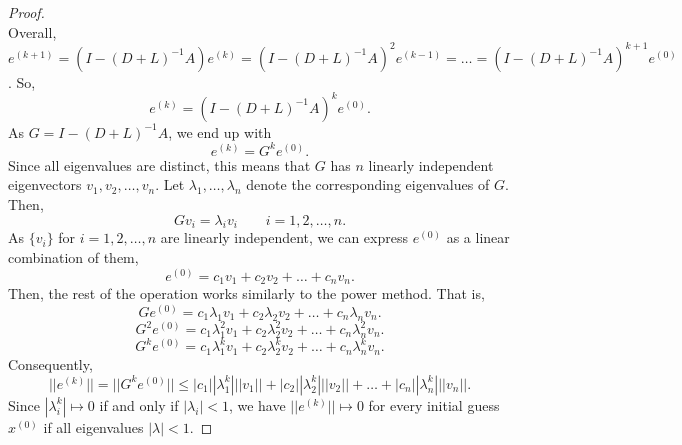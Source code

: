 \documentclass[letterpaper]{article}
\newcommand{\0}{\mathbf{0}}
\begin{document}
\begin{proof}
\begin{equation*}
    \end{equation*}
    Overall, $e^{(k + 1)} = (I - (D + L)^{-1}A)e^{(k)} = (I - (D + L)^{-1}A)^2 e^{(k - 1)} = \hdots = (I - (D + L)^{-1}A)^{k + 1} e^{(0)}$. So, \[e^{(k)} = (I - (D + L)^{-1} A)^k e^{(0)}.\] As $G = I - (D + L)^{-1} A$, we end up with \[e^{(k)} = G^k e^{(0)}.\] Since all eigenvalues are distinct, this means that $G$ has $n$ linearly independent eigenvectors $v_1, v_2, \hdots, v_n$. Let $\lambda_1, \hdots, \lambda_n$ denote the corresponding eigenvalues of $G$. Then, 
    \[Gv_i = \lambda_i v_i \qquad i = 1, 2, \hdots, n.\]
    As $\{v_i\}$ for $i = 1, 2, \hdots, n$ are linearly independent, we can express $e^{(0)}$ as a linear combination of them, 
    \[e^{(0)} = c_1 v_1 + c_2 v_2 + \hdots + c_n v_n.\]
    Then, the rest of the operation works similarly to the power method. That is, 
    \[Ge^{(0)} = c_1 \lambda_1 v_1 + c_2 \lambda_2 v_2 + \hdots + c_n \lambda_n v_n.\]
    \[G^2 e^{(0)} = c_1 \lambda_1^2 v_1 + c_2 \lambda_2^2 v_2 + \hdots + c_n \lambda_n^2 v_n.\]
    \[G^k e^{(0)} = c_1 \lambda_1^k v_1 + c_2 \lambda_2^k v_2 + \hdots + c_n \lambda_n^k v_n.\]
    Consequently, 
    \[||e^{(k)}|| = ||G^k e^{(0)}|| \leq |c_1| |\lambda_1^k| ||v_1|| + |c_2| |\lambda_2^k| ||v_2|| + \hdots + |c_n| |\lambda_n^k| ||v_n||.\]
    Since $|\lambda_i^k| \mapsto 0$ if and only if $|\lambda_i| < 1$, we have $||e^{(k)}|| \mapsto 0$ for every initial guess $x^{(0)}$ if all eigenvalues $|\lambda| < 1$. 
\end{proof}
\end{document}
